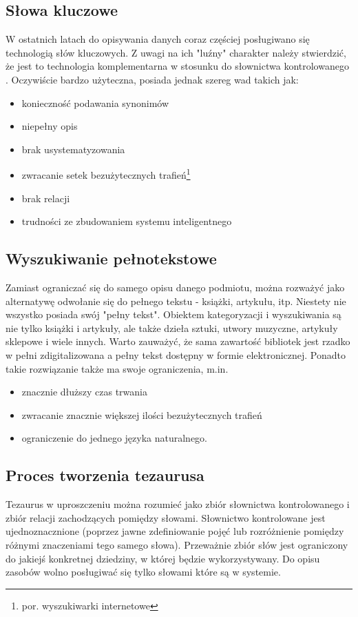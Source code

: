 \documentclass[12pt,a4paper,notitlepage]{article}
\begin{document}
\subsection{Słowa kluczowe}
W ostatnich latach do opisywania danych coraz częściej posługiwano się technologią słów kluczowych. Z uwagi na ich "luźny" charakter należy stwierdzić, że jest to technologia komplementarna w stosunku do słownictwa kontrolowanego \cite{KasperekKonf}. Oczywiście bardzo użyteczna, posiada jednak szereg wad takich jak:
\begin{itemize}
   \item konieczność podawania synonimów
	\item niepełny opis
	\item brak usystematyzowania
	\item zwracanie setek bezużytecznych trafień\footnote{por. wyszukiwarki internetowe}
	\item brak relacji
	\item trudności ze zbudowaniem systemu inteligentnego
\end{itemize}    

\subsection{Wyszukiwanie pełnotekstowe}
Zamiast ograniczać się do samego opisu danego podmiotu, można rozważyć jako alternatywę odwołanie się do pełnego tekstu - książki, artykułu, itp. Niestety nie wszystko posiada swój "pełny tekst". Obiektem kategoryzacji i wyszukiwania są nie tylko książki i artykuły, ale także dzieła sztuki, utwory muzyczne, artykuły sklepowe i wiele innych. Warto zauważyć, że sama zawartość bibliotek jest rzadko w pełni zdigitalizowana a pełny tekst dostępny w formie elektronicznej. Ponadto takie rozwiązanie także ma swoje ograniczenia, m.in.
 \begin{itemize}
   \item znacznie dłuższy czas trwania
	\item zwracanie znacznie większej ilości bezużytecznych trafień
	\item ograniczenie do jednego języka naturalnego.
\end{itemize}

\subsection{Proces tworzenia tezaurusa}
Tezaurus w uproszczeniu można rozumieć jako zbiór słownictwa kontrolowanego i zbiór relacji zachodzących pomiędzy słowami.
Słownictwo kontrolowane jest ujednoznacznione (poprzez jawne zdefiniowanie pojęć lub rozróżnienie pomiędzy różnymi znaczeniami tego samego słowa). Przeważnie zbiór słów jest ograniczony do jakiejś konkretnej dziedziny, w której będzie wykorzystywany. Do opisu zasobów wolno posługiwać się tylko słowami które są w systemie. 
\end{document}
